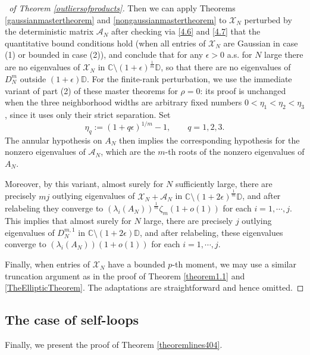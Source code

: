 \documentclass[11pt,reqno]{amsart}
\theoremstyle{plain}
\theoremstyle{remark}
\numberwithin{equation}{section}
\begin{document}
\begin{proof}[\proofname\ of Theorem \ref{outliersofproducts}]
Then we can apply Theorems \ref{gaussianmastertheorem} and \ref{nongaussianmastertheorem} to $\mathcal{X}_N$ perturbed by the deterministic matrix $\mathcal{A}_N$ after checking via \eqref{4.6} and \eqref{4.7} that the quantitative bound conditions hold (when all entries of $\mathcal{X}_N$ are Gaussian in case (1) or bounded in case (2)), and conclude that for any $\epsilon>0$ a.s. for $N$ large there are no eigenvalues of $\mathcal{X}_N$ in $\mathbb{C}\setminus (1+\epsilon)^\frac{1}{m}\mathbb{D}$, so that  there are no eigenvalues of $D_N^m$ outside $(1+\epsilon)\mathbb{D}$. For the finite-rank perturbation, we use the immediate variant of part (2) of these master theorems for $\rho=0$: its proof is unchanged when the three neighborhood widths are arbitrary fixed numbers $0<\eta_1<\eta_2<\eta_3$, since it uses only their strict separation. Set
\[
\eta_q:=(1+q\epsilon)^{1/m}-1,\qquad q=1,2,3.
\]
The annular hypothesis on $A_N$ then implies the corresponding hypothesis for the nonzero eigenvalues of $\mathcal A_N$, which are the $m$-th roots of the nonzero eigenvalues of $A_N$.



Moreover, by this variant, almost surely for $N$ sufficiently large, there are precisely $mj$ outlying eigenvalues of $\mathcal{X}_N+\mathcal{A}_N$ in $\mathbb{C}\setminus (1+2\epsilon)^\frac{1}{m}\mathbb{D}$, and after relabeling they converge to $(\lambda_i(A_N))^\frac{1}{m}\zeta_m(1+o(1))$ for each $i=1,\cdots,j$. This implies that almost surely for $N$ large, there are precisely $j$ outlying eigenvalues of $D_N^{m,1}$ in $\mathbb{C}\setminus (1+2\epsilon)\mathbb{D}$, and after relabeling, these eigenvalues converge to $(\lambda_i(A_N))(1+o(1))$ for each $i=1,\cdots,j$. 

Finally, when entries of $\mathcal{X}_N$ have a bounded $p$-th moment, we may use a similar truncation argument as in the proof of Theorem \ref{theorem1.1} and \ref{TheEllipticTheorem}. The adaptations are straightforward and hence omitted.\end{proof}

\subsection{The case of self-loops}Finally, we present the proof of Theorem \ref{theoremlines404}.
\end{document}
